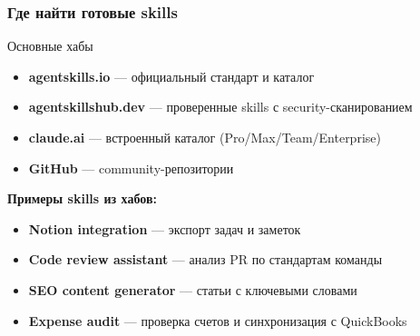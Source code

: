 \documentclass[aspectratio=169]{beamer}
\begin{document}
\begin{frame}
\frametitle{Где найти готовые skills}

\begin{block}{Основные хабы}
\begin{itemize}
    \item \textbf{agentskills.io} — официальный стандарт и каталог
    \item \textbf{agentskillshub.dev} — проверенные skills с security-сканированием
    \item \textbf{claude.ai} — встроенный каталог (Pro/Max/Team/Enterprise)
    \item \textbf{GitHub} — community-репозитории
\end{itemize}
\end{block}

\vspace{0.3cm}

\textbf{Примеры skills из хабов:}
\begin{itemize}
    \item \textbf{Notion integration} — экспорт задач и заметок
    \item \textbf{Code review assistant} — анализ PR по стандартам команды
    \item \textbf{SEO content generator} — статьи с ключевыми словами
    \item \textbf{Expense audit} — проверка счетов и синхронизация с QuickBooks
\end{itemize}

\end{frame}

\end{document}
